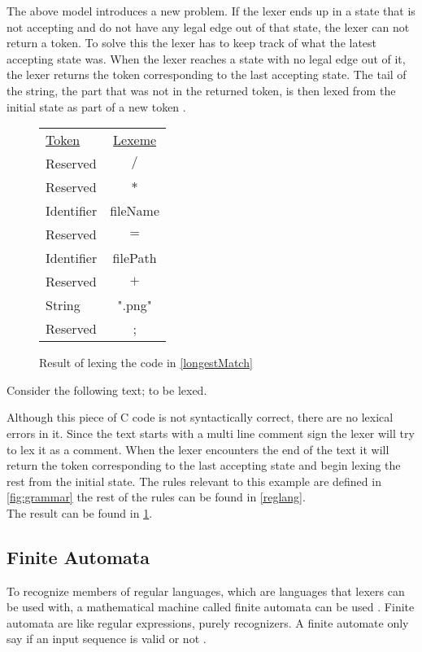 The above model introduces a new problem. If the lexer ends up in a state that
is not accepting and do not have any legal edge out of that state, the lexer
can not return a token. To solve this the lexer has to keep track of what the
latest accepting state was. When the lexer reaches a state with no
legal edge out of it, the lexer returns the token corresponding to the last
accepting state. The tail of the string, the part that was not in the returned
token, is then lexed from the initial state as part of a new token
\cite{Aho2006}.
\newline
\begin{figure}[ht!]
\begin{center}
\begin{tabular}{l c}
\underline{Token} & \underline{Lexeme}\\
Reserved & $/$\\
Reserved & $*$\\
Identifier &fileName\\
Reserved & $=$\\
Identifier & filePath\\
Reserved & $+$\\
String & ".png"\\
Reserved & ;
\end{tabular}
\end{center}
\caption{Result of lexing the code in \cref{longestMatch} \label{fig:longestmatch}}
\end{figure}

\begin{example} \label{longestMatch}
Consider the following text; to be lexed.

Although this piece of C code is not syntactically correct, there are no
lexical errors in it. Since
the text starts with a multi line comment sign the lexer will try to lex it as
a comment. When the lexer encounters the end of the text it will return the
token corresponding to the last accepting state and begin lexing the rest from
the initial state. The rules relevant to this example are defined in 
\cref{fig:grammar} the rest of the rules can be found in \cref{reglang}.\\
The result can be found in \cref{fig:longestmatch}.
\end{example}

\subsection{Finite Automata}
To recognize members of regular languages, which are languages that lexers can
be used with, a mathematical machine called finite automata can be used
\cite{sebesta2012}. Finite automata are like regular expressions, purely
recognizers. A finite automate only say if an input sequence is valid or not
\cite{Aho2006}.

